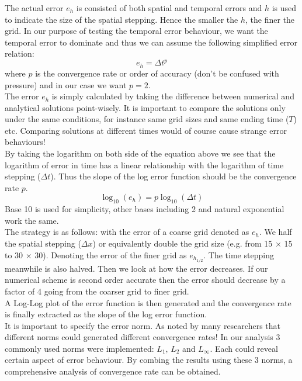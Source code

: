 The actual error $e_h$ is consisted of both spatial and temporal errors and $h$ is used to indicate the size of the spatial stepping. Hence the smaller the $h$, the finer the grid. In our purpose of testing the temporal error behaviour, we want the temporal error to dominate and thus we can assume the following simplified error relation:
\begin{equation}
e_h = \Delta t^p
\end{equation}
where $p$ is the convergence rate or order of accuracy (don't be confused with pressure) and in our case we want $p=2$.\\

The error $e_h$ is simply calculated by taking the difference between numerical and analytical solutions point-wisely. It is important to compare the solutions only under the same conditions, for instance same grid sizes and same ending time ($T$) etc. Comparing solutions at different times would of course cause strange error behaviours!\\

By taking the logarithm on both side of the equation above we see that the logarithm of error in time has a linear relationship with the logarithm of time stepping ($\Delta t$). Thus the slope of the log error function should be the convergence rate $p$.
\begin{equation}
\log_{10} (e_h) = p\log_{10} (\Delta t)
\end{equation}
Base 10 is used for simplicity, other bases including 2 and natural exponential work the same.\\

The strategy is as follows: with the error of a coarse grid denoted as $e_h$. We half the spatial stepping ($\Delta x$) or equivalently double the grid size (e.g. from 15 $\times$ 15 to 30 $\times$ 30). Denoting the error of the finer grid as $e_{h_{1/2}}$. The time stepping meanwhile is also halved. Then we look at how the error decreases. If our numerical scheme is second order accurate then the error should decrease by a factor of 4 going from the coarser grid to finer grid.\\

A Log-Log plot of the error function is then generated and the convergence rate is finally extracted as the slope of the log error function.\\

It is important to specify the error norm. As noted by many researchers that different norms could generated different convergence rates! \cite{pyo2005normal,guermond2004error} In our analysis 3 commonly used norms were implemented: $L_1,\,L_2$ and $L_\infty$. Each could reveal certain aspect of error behaviour. By combing the results using these 3 norms, a comprehensive analysis of convergence rate can be obtained.\\

